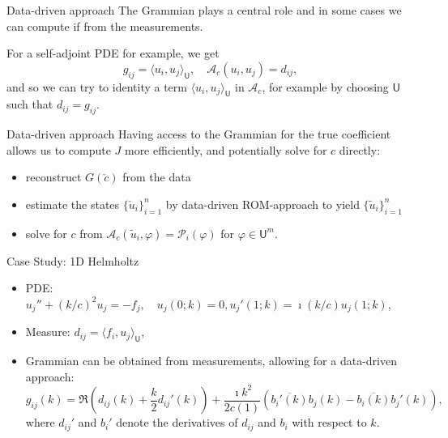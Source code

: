 \documentclass{beamer}
\newcommand{\sU}{\mathsf{U}}
\newcommand{\mA}{\mathcal{A}}
\newcommand{\mP}{\mathcal{P}}
\begin{document}
\begin{frame}{Data-driven approach}
The Grammian plays a central role and in some cases we can compute if from the measurements.

For a self-adjoint PDE for example, we get
$$g_{ij} = \langle u_i, u_j \rangle_\sU, \quad \mA_c(u_i,u_j) = d_{ij},$$
and so we can try to identity a term $\langle u_i, u_j\rangle_\sU$ in $\mathcal{A}_c$, for example by choosing $\sU$ such that $d_{ij} = g_{ij}$.
\end{frame}

\begin{frame}{Data-driven approach}
Having access to the Grammian for the true coefficient allows us to compute $J$ more efficiently, and potentially solve for $c$ directly:
\begin{itemize}
  \item reconstruct $G(\check{c})$ from the data
  \item estimate the states $\{\check{u}_i\}_{i=1}^n$ by data-driven ROM-approach to yield $\{\widetilde{u}_i\}_{i=1}^n$ 
  \item solve for $c$ from $\mA_c(\widetilde{u}_i,\varphi)=\mP_i(\varphi)$ for $\varphi\in \sU^m$.
\end{itemize}
\end{frame}


\begin{frame}{Case Study: 1D Helmholtz}
\begin{itemize}
  \item PDE: $u_j'' + (k/c)^2 u_j = -f_j, \quad u_j(0;k) = 0, u_j'(1;k)=\imath (k/c)u_j(1;k)$,
  \item Measure: $d_{ij} = \langle f_i, u_j\rangle_\sU$,
  \item Grammian can be obtained from measurements, allowing for a data-driven approach: $$ g_{ij}(k) = \Re\left(d_{ij}(k) + {\textstyle\frac{k}{2}}d_{ij}'(k)\right) + {\textstyle\frac{\imath k^2}{2c(1)}}\left(\overline{b_i'(k)}b_j(k) - \overline{b_i(k)}b_j'(k)\right),
$$
where $d_{ij}'$ and $b_i'$ denote the derivatives of $d_{ij}$ and $b_i$ with respect to $k$. 
\end{itemize}
\end{frame}
\end{document}
